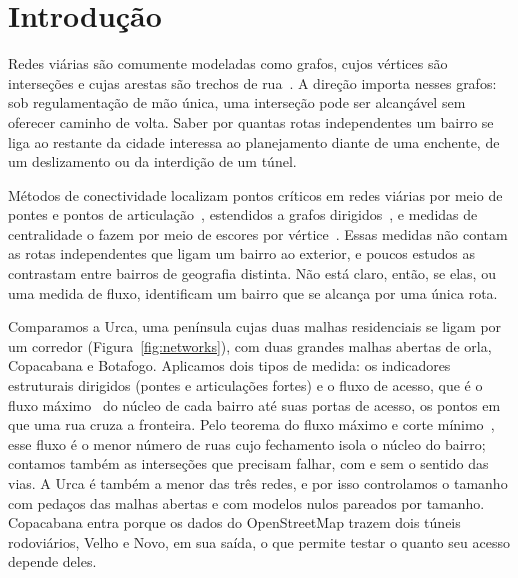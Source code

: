 

\section{Introdução}
\label{sec:intro}

Redes viárias são comumente modeladas como grafos, cujos vértices são
interseções e cujas arestas são trechos de rua~\cite{boeing}. A direção
importa nesses grafos: sob regulamentação de mão única, uma interseção
pode ser alcançável sem oferecer caminho de volta. Saber por quantas rotas independentes um bairro
se liga ao restante da cidade interessa ao planejamento diante de uma
enchente, de um deslizamento ou da interdição de um túnel.

Métodos de conectividade localizam pontos críticos em redes viárias por
meio de pontes e pontos de articulação~\cite{tarjan1972depth}, estendidos
a grafos dirigidos~\cite{italiano2012finding}, e medidas de centralidade
o fazem por meio de escores por vértice~\cite{alatristasalas2019,kirkley2018betweenness}.
Essas medidas não contam as rotas independentes que ligam um bairro ao
exterior, e poucos estudos as contrastam entre bairros de geografia
distinta. Não está claro, então, se elas, ou uma medida de fluxo,
identificam um bairro que se alcança por uma única rota.

Comparamos a Urca, uma península cujas duas malhas residenciais se ligam
por um corredor (Figura~\ref{fig:networks}), com duas grandes malhas
abertas de orla, Copacabana e Botafogo. Aplicamos dois tipos de medida:
os indicadores estruturais dirigidos (pontes e articulações fortes) e o
fluxo de acesso, que é o fluxo máximo~\cite{edmonds1972theoretical} do
núcleo de cada bairro até suas portas de acesso, os pontos em que uma rua
cruza a fronteira. Pelo teorema do fluxo máximo e corte mínimo~\cite{ford1956maximal}, esse
fluxo é o menor número de ruas cujo fechamento isola o núcleo do bairro; contamos
também as interseções que precisam falhar, com e sem o sentido das vias.
A Urca é também a menor das três redes, e por
isso controlamos o tamanho com pedaços das malhas abertas e com modelos
nulos pareados por tamanho. Copacabana entra porque os dados do
OpenStreetMap trazem dois túneis rodoviários, Velho e Novo, em sua saída,
o que permite testar o quanto seu acesso depende deles.

